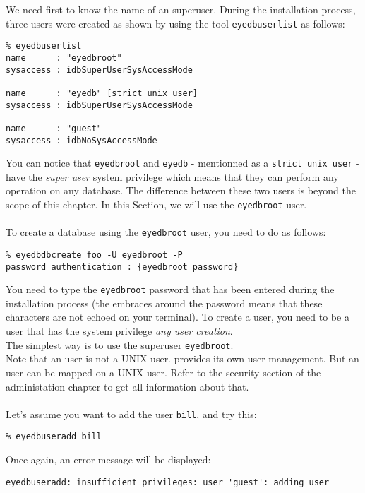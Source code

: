 We need first to know the name of an \eyedb superuser. During the installation
process, three \eyedb users were created as shown by using the tool
\texttt{eyedbuserlist} as follows:
\verbsize
\begin{verbatim}
% eyedbuserlist
name      : "eyedbroot"
sysaccess : idbSuperUserSysAccessMode
 
name      : "eyedb" [strict unix user]
sysaccess : idbSuperUserSysAccessMode

name      : "guest"
sysaccess : idbNoSysAccessMode
\end{verbatim}
\normalsize
You can notice that \texttt{eyedbroot} and \texttt{eyedb}
- mentionned as a \texttt{strict unix user} - have
the \emph{super user} system privilege which means that they can perform
any operation on any database. The difference between these two users
is beyond the scope of this chapter. In this Section, we will use 
the \texttt{eyedbroot} user.
\\
\\
To create a database using the \texttt{eyedbroot} user, you need to do
as follows:
\verbsize
\begin{verbatim}
% eyedbdbcreate foo -U eyedbroot -P
password authentication : {eyedbroot password}
\end{verbatim}
\normalsize
You need to type the \texttt{eyedbroot} password that has been entered
during the installation process (the embraces around the password means that
these characters are not echoed on your terminal).
To create a user, you need to be a user that has the system privilege
\emph{any user creation}.
\\
The simplest way is to use the \eyedb superuser \texttt{eyedbroot}.
\\
Note that an \eyedb user is not a UNIX user. \eyedb provides its own
user management. But an \eyedb user can be mapped on a UNIX user.
Refer to the security section of the administation chapter to get
all information about that.
\\
\\
Let's assume you want to add the user \texttt{bill}, and try this:
\verbsize \begin{verbatim}
% eyedbuseradd bill
\end{verbatim}
\normalsize
Once again, an error message will be displayed:
\verbsize \begin{verbatim}
eyedbuseradd: insufficient privileges: user 'guest': adding user
\end{verbatim}
